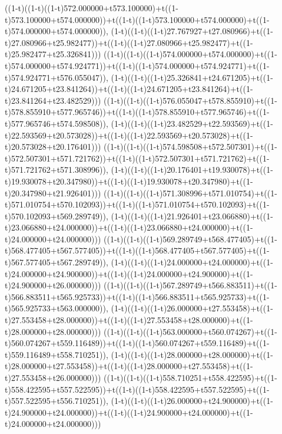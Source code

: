 ((1-t)((1-t)((1-t)572.000000+t573.100000)+t((1-t)573.100000+t574.000000))+t((1-t)((1-t)573.100000+t574.000000)+t((1-t)574.000000+t574.000000)),                                     (1-t)((1-t)((1-t)27.767927+t27.080966)+t((1-t)27.080966+t25.982477))+t((1-t)((1-t)27.080966+t25.982477)+t((1-t)25.982477+t25.326841)))
((1-t)((1-t)((1-t)574.000000+t574.000000)+t((1-t)574.000000+t574.924771))+t((1-t)((1-t)574.000000+t574.924771)+t((1-t)574.924771+t576.055047)),                                     (1-t)((1-t)((1-t)25.326841+t24.671205)+t((1-t)24.671205+t23.841264))+t((1-t)((1-t)24.671205+t23.841264)+t((1-t)23.841264+t23.482529)))
((1-t)((1-t)((1-t)576.055047+t578.855910)+t((1-t)578.855910+t577.965746))+t((1-t)((1-t)578.855910+t577.965746)+t((1-t)577.965746+t574.598508)),                                     (1-t)((1-t)((1-t)23.482529+t22.593569)+t((1-t)22.593569+t20.573028))+t((1-t)((1-t)22.593569+t20.573028)+t((1-t)20.573028+t20.176401)))
((1-t)((1-t)((1-t)574.598508+t572.507301)+t((1-t)572.507301+t571.721762))+t((1-t)((1-t)572.507301+t571.721762)+t((1-t)571.721762+t571.308996)),                                     (1-t)((1-t)((1-t)20.176401+t19.930078)+t((1-t)19.930078+t20.347980))+t((1-t)((1-t)19.930078+t20.347980)+t((1-t)20.347980+t21.926401)))
((1-t)((1-t)((1-t)571.308996+t571.010754)+t((1-t)571.010754+t570.102093))+t((1-t)((1-t)571.010754+t570.102093)+t((1-t)570.102093+t569.289749)),                                     (1-t)((1-t)((1-t)21.926401+t23.066880)+t((1-t)23.066880+t24.000000))+t((1-t)((1-t)23.066880+t24.000000)+t((1-t)24.000000+t24.000000)))
((1-t)((1-t)((1-t)569.289749+t568.477405)+t((1-t)568.477405+t567.577405))+t((1-t)((1-t)568.477405+t567.577405)+t((1-t)567.577405+t567.289749)),                                     (1-t)((1-t)((1-t)24.000000+t24.000000)+t((1-t)24.000000+t24.900000))+t((1-t)((1-t)24.000000+t24.900000)+t((1-t)24.900000+t26.000000)))
((1-t)((1-t)((1-t)567.289749+t566.883511)+t((1-t)566.883511+t565.925733))+t((1-t)((1-t)566.883511+t565.925733)+t((1-t)565.925733+t563.000000)),                                     (1-t)((1-t)((1-t)26.000000+t27.553458)+t((1-t)27.553458+t28.000000))+t((1-t)((1-t)27.553458+t28.000000)+t((1-t)28.000000+t28.000000)))
((1-t)((1-t)((1-t)563.000000+t560.074267)+t((1-t)560.074267+t559.116489))+t((1-t)((1-t)560.074267+t559.116489)+t((1-t)559.116489+t558.710251)),                                     (1-t)((1-t)((1-t)28.000000+t28.000000)+t((1-t)28.000000+t27.553458))+t((1-t)((1-t)28.000000+t27.553458)+t((1-t)27.553458+t26.000000)))
((1-t)((1-t)((1-t)558.710251+t558.422595)+t((1-t)558.422595+t557.522595))+t((1-t)((1-t)558.422595+t557.522595)+t((1-t)557.522595+t556.710251)),                                     (1-t)((1-t)((1-t)26.000000+t24.900000)+t((1-t)24.900000+t24.000000))+t((1-t)((1-t)24.900000+t24.000000)+t((1-t)24.000000+t24.000000)))
